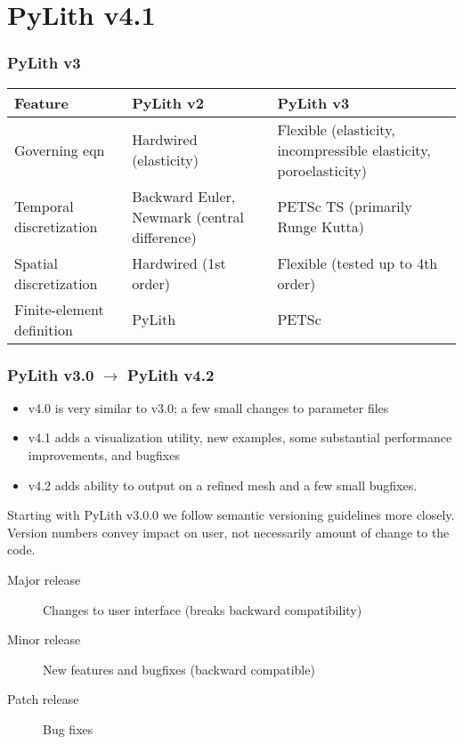 \documentclass[aspectratio=169]{beamer}
\begin{document}
\section{PyLith v4.1}

\begin{frame}
  \frametitle{PyLith v3}

  \footnotesize{\begin{tabular}{p{3.0cm}p{5.0cm}p{5.0cm}}
    \toprule
    Feature
    & PyLith v2
    & PyLith v3 \\
    \midrule
    Governing eqn
    & Hardwired (elasticity)
    & Flexible (elasticity, incompressible elasticity, poroelasticity)
    \\[2em]
    Temporal discretization
    & Backward Euler, Newmark (central difference)
    & PETSc TS (primarily Runge Kutta)
      \\[2em]
    Spatial discretization
    & Hardwired (1st order)
    & Flexible (tested up to 4th order)
           \\[1em]
           Finite-element definition
           & PyLith
           & PETSc \\
    \bottomrule
  \end{tabular}}
    
\end{frame}


\begin{frame}
  \frametitle{PyLith v3.0 $\rightarrow$ PyLith v4.2}
  \summary{}

  \begin{itemize}
  \item v4.0 is very similar to v3.0; a few small changes to parameter files
  \item v4.1 adds a visualization utility, new examples, some substantial performance improvements, and bugfixes
  \item v4.2 adds ability to output on a refined mesh and a few small bugfixes.
  \end{itemize}

  \vfill\pause

  Starting with PyLith v3.0.0 we follow semantic versioning guidelines more closely.\\
  Version numbers convey impact on user, not necessarily amount of change to the code.

  \begin{description}
  \item[Major release] Changes to user interface (breaks backward compatibility)
  \item[Minor release] New features and bugfixes (backward compatible)
  \item[Patch release] Bug fixes
  \end{description}
    
\end{frame}
\end{document}
